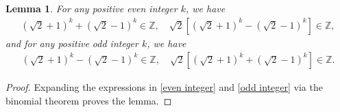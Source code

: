 \documentclass[11pt]{article}
\theoremstyle{plain}
\newtheorem{lem}[thm]{Lemma}
\theoremstyle{definition}
\begin{document}
	\begin{lem}\label{either an integer or an integer}
 For any positive even integer $k$, we have
 \begin{align}\label{even integer}
 \left( \sqrt{2}+1 \right) ^k+\left( \sqrt{2}-1 \right) ^k\in \mathbb{Z} ,
 \quad 
 \sqrt{2}\left[ \left( \sqrt{2}+1 \right) ^k-\left( \sqrt{2}-1 \right) ^k \right] \in \mathbb{Z} ,
\end{align}
 and  for any positive odd integer $k$, we have 
  \begin{align}\label{odd integer}
 	\left( \sqrt{2}+1 \right) ^k-\left( \sqrt{2}-1 \right) ^k\in \mathbb{Z} ,
  \quad 
 	\sqrt{2}\left[ \left( \sqrt{2}+1 \right) ^k+\left( \sqrt{2}-1 \right) ^k \right] \in \mathbb{Z} .
 \end{align}
\end{lem}
\begin{proof}
	Expanding the expressions in \eqref{even integer} and \eqref{odd integer} via the binomial theorem proves the lemma.
\end{proof}
\end{document}
